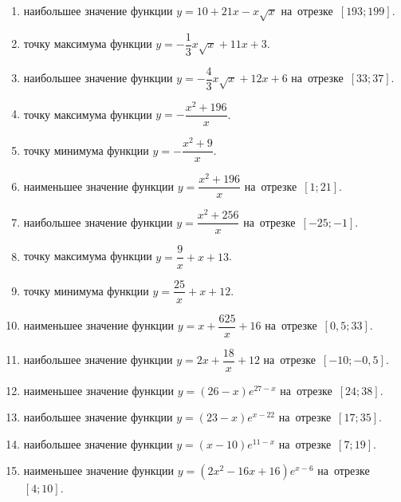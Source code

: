 \documentclass[a4paper,10pt]{article}
\begin{document}
\begin{enumerate}
\item {} наибольшее значение функции $y=10+21x -x\sqrt{x}$ на~отрезке~$\left[193;199\right]$.

\item {} точку максимума функции $y=-\dfrac{1}{3}x\sqrt{x} +11x+3$.

\item {} наибольшее значение функции $y=-\dfrac{4}{3}x\sqrt{x} +12x+6$ на~отрезке~$\left[33;37\right]$.

\item {} точку максимума функции $y=-\dfrac{x^2 +196}{x}$.

\item {} точку минимума функции $y=-\dfrac{x^2 +9}{x}$.

\item {} наименьшее значение функции $y=\dfrac{x^2 +196}{x}$ на~отрезке~$\left[1;21\right]$.

\item {} наибольшее значение функции $y=\dfrac{x^2 +256}{x}$ на~отрезке~$\left[-25;-1\right]$.

\item {} точку максимума функции $y=\dfrac{9}{x} +x+13$.

\item {} точку минимума функции $y=\dfrac{25}{x} +x+12$.

\item {} наименьшее значение функции $y=x+\dfrac{625}{x} +16$ на~отрезке~$\left[0,5;33\right]$.

\item {} наибольшее значение функции $y=2x+\dfrac{18}{x} +12$ на~отрезке~$\left[-10;-0,5\right]$.

\item {} наименьшее значение функции $y=\left(26-x\right)e^{27-x}$ на~отрезке~$\left[24;38\right]$.

\item {} наибольшее значение функции $y=\left(23-x\right)e^{x-22}$ на~отрезке~$\left[17;35\right]$.

\item {} наибольшее значение функции $y=\left(x-10\right)e^{11-x}$ на~отрезке~$\left[7;19\right]$.

\item {} наименьшее значение функции $y=\left(2x^2 -16x +16\right)e^{x -6}$ на~отрезке~$\left[4;10\right]$.


\end{enumerate}
\end{document}
